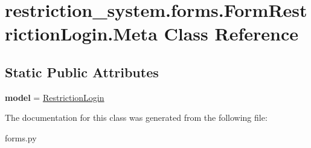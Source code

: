 \hypertarget{classrestriction__system_1_1forms_1_1FormRestrictionLogin_1_1Meta}{}\section{restriction\+\_\+system.\+forms.\+Form\+Restriction\+Login.\+Meta Class Reference}
\label{classrestriction__system_1_1forms_1_1FormRestrictionLogin_1_1Meta}
\subsection*{Static Public Attributes}
\begin{DoxyCompactItemize}
\item 
\hypertarget{classrestriction__system_1_1forms_1_1FormRestrictionLogin_1_1Meta_ad4e22e57eebc849aa2beebff1e20406c}{}{\bfseries model} = \hyperlink{classrestriction__system_1_1models_1_1RestrictionLogin}{Restriction\+Login}\label{classrestriction__system_1_1forms_1_1FormRestrictionLogin_1_1Meta_ad4e22e57eebc849aa2beebff1e20406c}

\end{DoxyCompactItemize}


The documentation for this class was generated from the following file\+:\begin{DoxyCompactItemize}
\item 
forms.\+py\end{DoxyCompactItemize}
